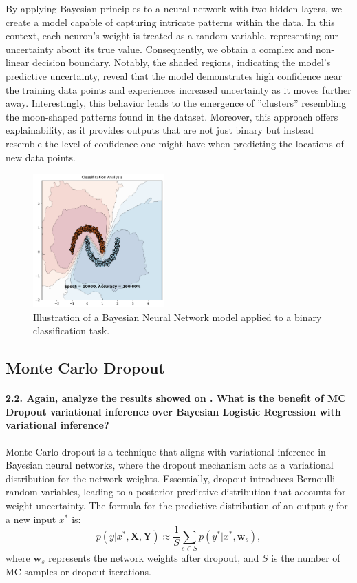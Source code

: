 By applying Bayesian principles to a neural network with two hidden layers, we create a model capable of capturing intricate patterns within the data. In this context, each neuron's weight is treated as a random variable, representing our uncertainty about its true value. Consequently, we obtain a complex and non-linear decision boundary. Notably, the shaded regions, indicating the model's predictive uncertainty, reveal that the model demonstrates high confidence near the training data points and experiences increased uncertainty as it moves further away. Interestingly, this behavior leads to the emergence of ''clusters'' resembling the moon-shaped patterns found in the dataset. Moreover, this approach offers explainability, as it provides outputs that are not just binary but instead resemble the level of confidence one might have when predicting the locations of new data points.

\begin{figure}[H]
    \centering
    \includegraphics[width=0.45\textwidth]{mlp_variational.pdf}
    \caption{Illustration of a Bayesian Neural Network model applied to a binary classification task.}
    \label{fig:mlp_variational}
\end{figure}

\subsection{Monte Carlo Dropout}
\paragraph{2.2. Again, analyze the results showed on . What is the benefit of MC Dropout variational inference over Bayesian Logistic Regression with variational inference?}

Monte Carlo dropout is a technique that aligns with variational inference in Bayesian neural networks, where the dropout mechanism acts as a variational distribution for the network weights. Essentially, dropout introduces Bernoulli random variables, leading to a posterior predictive distribution that accounts for weight uncertainty. The formula for the predictive distribution of an output $ y $ for a new input $ x^* $ is: \[ p(y | x^*, \mathbf{X}, \mathbf{Y}) \approx \frac{1}{S} \sum_{s \in S} p(y^* | x^*, \mathbf{w}_s), \] where $ \mathbf{w}_s $ represents the network weights after dropout, and $ S $ is the number of MC samples or dropout iterations.

